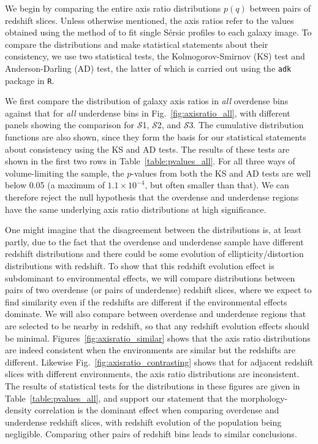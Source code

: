 \documentclass[twocolumn,useAMS,usenatbib]{mn2e}
\newcommand{\sersic}{S\'{e}rsic }
\newcommand{\s}{\ensuremath{\mathcal{S}}}
\begin{document}
We begin by comparing the entire axis ratio distributions $p(q)$
between pairs of redshift slices.  Unless otherwise mentioned, the
axis ratios refer to the values obtained using the method of
\cite{Claire_Fits} to fit single \sersic profiles to each galaxy image.
To compare the distributions and
make statistical statements about their consistency, we
use two statistical tests, the Kolmogorov-Smirnov (KS) test and
Anderson-Darling (AD) test, the latter of which is carried out using
the \texttt{adk} package in \texttt{R}.

We first compare the distribution of galaxy axis ratios in \emph{all}
overdense bins against that for \emph{all} underdense bins in
Fig.~\ref{fig:axisratio_all}, with different panels showing the
comparison for \s1, \s2, and \s3. 
The cumulative distribution functions are also shown, since they form
the basis for our statistical statements about consistency using the
KS and AD tests.  The results of these tests are shown in the first
two rows in Table~\ref{table:pvalues_all}.  For all three ways of
volume-limiting the sample, the $p$-values from both the KS and AD
tests are well below 0.05 (a maximum of $1.1\times 10^{-4}$, but often
smaller than that).  We can therefore reject the null hypothesis that
the overdense and underdense regions have the same underlying axis
ratio distributions at high significance.

One might imagine that the disagreement between the distributions is,
at least partly, due to the fact that the overdense and underdense
sample have different redshift distributions and there could be some
evolution of ellipticity/distortion distributions with redshift. 
To show that this redshift evolution effect is subdominant to
environmental effects, we will compare distributions between pairs of
two overdense (or pairs of underdense) redshift slices, where we
expect to find similarity even if the redshifts are different if the
environmental effects dominate.  We will also compare between
overdense and underdense regions that are selected to be nearby in
redshift, so that any redshift evolution effects should be minimal. 
Figures~\ref{fig:axisratio_similar}
shows that the axis ratio
distributions are indeed consistent when the environments are similar
but the redshifts are different.  Likewise
Fig.~\ref{fig:axisratio_contrasting} shows that for adjacent redshift
slices with different environments, the axis ratio distributions are
inconsistent.  The results of statistical tests for the distributions
in these figures are given in Table~\ref{table:pvalues_all}, and
support our statement that the morphology-density
correlation is the dominant effect when comparing overdense and
underdense redshift slices, with redshift evolution of the
population being negligible. 
Comparing other pairs of redshift
bins leads to similar conclusions. 
\end{document}
